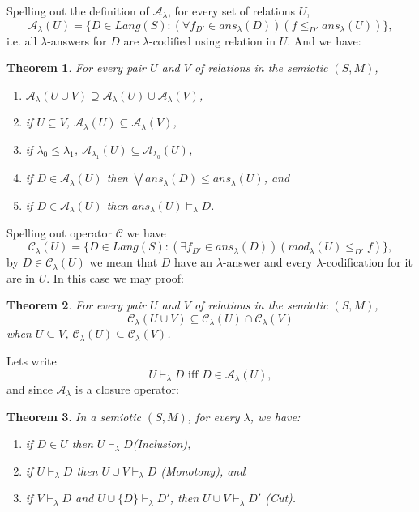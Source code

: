 \documentclass[oribibl]{llncs}
\newtheorem{thm}{Theorem}
\newcommand{\A}{\mathcal{A}}
\newcommand{\C}{\mathcal{C}}
\begin{document}
Spelling out the definition of $\A_\lambda$, for every set of
relations $U$,
\[\A_\lambda (U)=\{D\in Lang(S): (\forall f_{D'}\in ans_\lambda(D))(f\leq_{D'}
ans_\lambda (U)) \} ,\] i.e. all $\lambda$-answers for $D$ are
$\lambda$-codified using relation in $U$. And we have:

\begin{thm}\label{soundness}
For every pair $U$ and $V$ of relations in the semiotic $(S,M)$,
\begin{enumerate}
  \item $\A_\lambda(U\cup V)\supseteq \A_\lambda(U)\cup \A_\lambda(V)$,
  \item if $U\subseteq V$, $\A_\lambda(U)\subseteq \A_\lambda(V)$,
  \item if $\lambda_0\leq\lambda_1$, $\A_{\lambda_1}(U)\subseteq
  \A_{\lambda_0}(U)$,
  \item if $D\in \A_\lambda(U)$ then $\bigvee ans_\lambda(D)\leq ans_\lambda(U)$, and
  \item if $D\in \A_\lambda(U)$ then $ans_\lambda(U)\models_\lambda D$.
\end{enumerate}
\end{thm}

Spelling out operator $\C$ we have
\[\C_\lambda (U)=\{D\in Lang(S): (\exists f_{D'}\in ans_\lambda(D)) (mod_\lambda(U)\leq_{D'} f) \} ,\]  by
$D\in \C_\lambda (U)$ we mean that $D$ have an $\lambda$-answer and
every $\lambda$-codification for it are in $U$. In this case we may
proof:

\begin{thm}
For every pair $U$ and $V$ of relations in the semiotic $(S,M)$,
\[\C_\lambda(U\cup V)\subseteq \C_\lambda(U)\cap \C_\lambda(V)\]
when $U\subseteq V$, $\C_\lambda(U)\subseteq \C_\lambda(V)$.
\end{thm}

Lets write
\[ U\vdash_\lambda D \text{ iff } D\in \A_\lambda(U), \]
and since $\A_\lambda$ is a closure operator:
\begin{thm} In a semiotic $(S,M)$, for every $\lambda$, we have:
    \begin{enumerate}
        \item if $D\in U$ then $U\vdash_\lambda D$(Inclusion),
        \item if $U\vdash_\lambda D$ then $U\cup V\vdash_\lambda
        D$ (Monotony), and
        \item if $V\vdash_\lambda D$ and $U\cup \{D\}\vdash_\lambda
        D'$, then $U\cup V\vdash_\lambda D'$ (Cut).
    \end{enumerate}
\end{thm}
\end{document}
